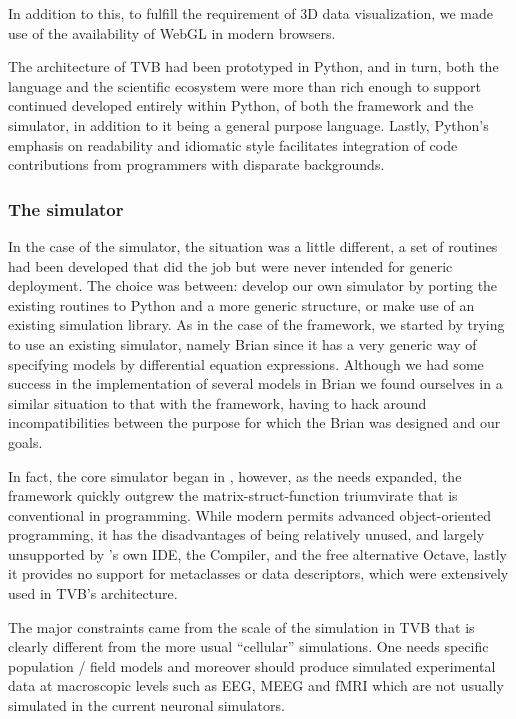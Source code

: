In addition to this, to fulfill the requirement of 3D data visualization, we 
made use of the availability of WebGL in modern browsers.

The architecture of TVB had been prototyped in Python, and in turn, both the
language and the scientific ecosystem were more than rich enough to support
continued developed entirely within Python, of both the framework and the
simulator, in addition to it being a general purpose language. Lastly, Python's
emphasis on readability and idiomatic style facilitates integration of 
code contributions from programmers with disparate backgrounds.


\subsubsection{The simulator}

In the case of the simulator, the situation was a little different, 
a set of \matlab{} routines had been developed that did the job but were never
intended for generic
deployment. The choice was between: develop our own simulator by porting the 
existing \matlab{} routines to Python and a more generic structure, or make use
of an existing simulation library. As in the case of the framework, we started 
by trying to use an existing
simulator, namely Brian \cite{Goodman_2009} since it has a very generic way of
specifying models by differential equation expressions. Although we had some
success in the implementation of several models in Brian we found ourselves in a
similar situation to that with the framework, having to hack around incompatibilities
between the purpose for which the Brian was designed and our goals. 

In fact, the core simulator began in \matlab{}, however, as the needs 
expanded, the framework quickly 
outgrew the matrix-struct-function triumvirate that is conventional
in \matlab{} programming. While modern \matlab{} permits advanced object-oriented
programming, it has the disadvantages of being relatively unused, and
largely unsupported by \matlab{}'s own IDE, the \matlab{} Compiler, and the free
alternative Octave, lastly it provides no support for metaclasses or data
descriptors, which were extensively used in TVB's architecture.

The major constraints came from the scale of the simulation in TVB that is
clearly different from the more usual ``cellular'' simulations. One needs specific
population / field models and moreover should produce simulated experimental
data at macroscopic levels such as EEG, MEEG and fMRI which are not usually
simulated in the current neuronal simulators.

